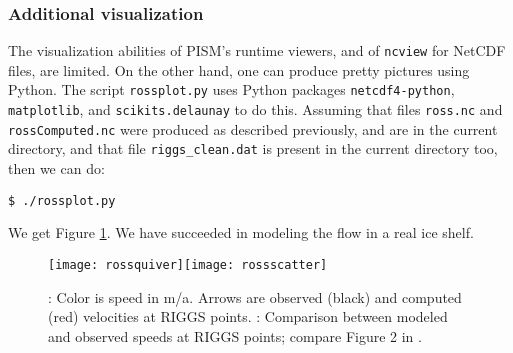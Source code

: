\subsubsection*{Additional visualization}  The visualization abilities of PISM's runtime viewers, and of \texttt{ncview} for NetCDF files, are limited.  On the other hand, one can produce pretty pictures using Python.  The script \texttt{rossplot.py} uses Python packages \texttt{netcdf4-python}, \texttt{matplotlib}, and \texttt{scikits.delaunay} to do this.  Assuming that files \texttt{ross.nc} and \texttt{rossComputed.nc} were produced as described previously, and are in the current directory, and that file \texttt{riggs_clean.dat} is present in the current directory too, then we can do:

\begin{verbatim}
$ ./rossplot.py
\end{verbatim}

\noindent We get Figure \ref{fig:rosspython}.  We have succeeded in modeling the flow in a real ice shelf.

\begin{figure}[ht]
\centering
\mbox{\texttt{[image: rossquiver]}\quad \texttt{[image: rossscatter]}}
\caption{: Color is speed in m/a.  Arrows are observed (black) and computed (red) velocities at RIGGS points.  : Comparison between modeled and observed speeds at RIGGS points; compare Figure 2 in \cite{MacAyealetal}.}
\label{fig:rosspython}
\end{figure}


